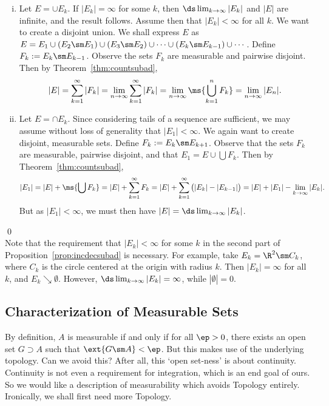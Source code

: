 \pf \hfill
\begin{enumerate}[(i)]
\item Let $E= \cup E_k$. If $|E_k|=\infty$ for some $k$, then $\ds\lim_{k \to \infty} |E_k|$ and $|E|$ are infinite, and the result follows. Assume then that $|E_k|<\infty$ for all $k$. We want to create a disjoint union. We shall express $E$ as $E= E_1 \cup (E_2 \sm E_1) \cup (E_3 \sm E_2) \cup \cdots \cup (E_k \sm E_{k-1}) \cup \cdots$. Define $F_k:= E_k \sm E_{k-1}$. Observe the sets $F_k$ are measurable and pairwise disjoint. Then by Theorem~\ref{thm:countsubad},
	\[
	|E|= \sum_{k=1}^\infty |F_k|= \lim_{n \to \infty} \sum_{k=1}^\infty |F_k|= \lim_{n \to \infty} \ms{\bigcup_{k=1}^n F_k}= \lim_{n \to \infty} |E_n|.
	\]

\item Let $E= \cap E_k$. Since considering tails of a sequence are sufficient, we may assume without loss of generality that $|E_1|<\infty$. We again want to create disjoint, measurable sets. Define $F_k:= E_k \sm E_{k+1}$. Observe that the sets $F_k$ are measurable, pairwise disjoint, and that $E_1= E \cup \bigcup F_k$. Then by Theorem~\ref{thm:countsubad},
	\[
	|E_1|= |E| + \ms{\bigcup F_k}= |E|+ \sum_{k=1}^\infty F_k= |E| + \sum_{k=1}^\infty \big( |E_k| - |E_{k-1}| \big)= |E| + |E_1| - \lim_{k \to \infty} |E_k|.
	\]
But as $|E_1|<\infty$, we must then have $|E|= \ds \lim_{k \to \infty} |E_k|$. 
\end{enumerate} \qed \\


Note that the requirement that $|E_k|<\infty$ for some $k$ in the second part of Proposition~\ref{prop:incdecsubad} is necessary. For example, take $E_k= \R^2 \sm C_k$, where $C_k$ is the circle centered at the origin with radius $k$. Then $|E_k|=\infty$ for all $k$, and $E_k \searrow \emptyset$. However, $\ds \lim_{k \to \infty} |E_k|=\infty$, while $|\emptyset|=0$. 


 \subsection{Characterization of Measurable Sets}
 
 By definition, $A$ is measurable if and only if for all $\ep>0$, there exists an open set $G \supset A$ such that $\ext{G \sm A}<\ep$. But this makes use of the underlying topology. Can we avoid this? After all, this `open set-ness' is about continuity. Continuity is not even a requirement for integration, which is an end goal of ours. So we would like a description of measurability which avoids Topology entirely. Ironically, we shall first need more Topology.
 
